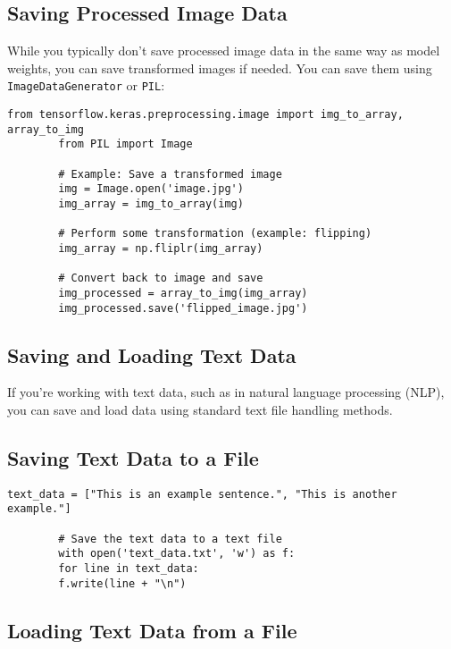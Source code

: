 	\subsection{Saving Processed Image Data}
	
	While you typically don't save processed image data in the same way as model weights, you can save transformed images if needed. You can save them using \texttt{ImageDataGenerator} or \texttt{PIL}:
	
	\begin{lstlisting}[caption={Saving Processed Image Data}, label={code:save-image}, style=pythonstyle]
		from tensorflow.keras.preprocessing.image import img_to_array, array_to_img
		from PIL import Image
		
		# Example: Save a transformed image
		img = Image.open('image.jpg')
		img_array = img_to_array(img)
		
		# Perform some transformation (example: flipping)
		img_array = np.fliplr(img_array)
		
		# Convert back to image and save
		img_processed = array_to_img(img_array)
		img_processed.save('flipped_image.jpg')
	\end{lstlisting}
	
	\subsection{Saving and Loading Text Data}
	
	If you're working with text data, such as in natural language processing (NLP), you can save and load data using standard text file handling methods.
	
	\subsection{Saving Text Data to a File}
	
	\begin{lstlisting}[caption={Saving Text Data to a File}, label={code:save-text}, style=pythonstyle]
		text_data = ["This is an example sentence.", "This is another example."]
		
		# Save the text data to a text file
		with open('text_data.txt', 'w') as f:
		for line in text_data:
		f.write(line + "\n")
	\end{lstlisting}
	
	\subsection{Loading Text Data from a File}
	
